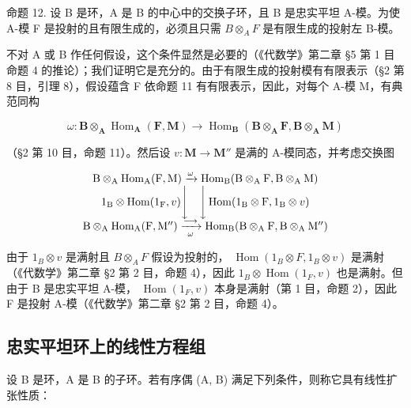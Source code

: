 命题 12. 设 B 是环，A 是 B 的中心中的交换子环，且 B 是忠实平坦 A-模。为使 A-模 F 是投射的且有限生成的，必须且只需 \(B \otimes_{A} F\) 是有限生成的投射左 B-模。

不对 A 或 B 作任何假设，这个条件显然是必要的（《代数学》第二章 §5 第 1 目命题 4 的推论）；我们证明它是充分的。由于有限生成的投射模有有限表示（§2 第 8 目，引理 8），假设蕴含 F 依命题 11 有有限表示，因此，对每个 A-模 M，有典范同构

\[
\omega : \mathbf {B} \otimes_ {\mathbf {A}} \operatorname{Hom} _ {\mathbf {A}} (\mathbf {F}, \mathbf {M}) \rightarrow \operatorname{Hom} _ {\mathbf {B}} (\mathbf {B} \otimes_ {\mathbf {A}} \mathbf {F}, \mathbf {B} \otimes_ {\mathbf {A}} \mathbf {M})
\]

（§2 第 10 目，命题 11）。然后设 \(v: \mathbf{M} \to \mathbf{M}''\) 是满的 A-模同态，并考虑交换图

\[
\begin{array}{c} \mathrm{B} \otimes_ {\mathrm{A}} \operatorname{Hom} _ {\mathrm{A}} (\mathrm{F}, \mathrm{M}) \xrightarrow {\omega} \operatorname{Hom} _ {\mathrm{B}} (\mathrm{B} \otimes_ {\mathrm{A}} \mathrm{F}, \mathrm{B} \otimes_ {\mathrm{A}} \mathrm{M}) \\ 1 _ {\mathrm{B}} \otimes \operatorname{Hom} (1 _ {\mathrm{F}}, v) \Bigg \downarrow \quad \Bigg \downarrow \operatorname{Hom} (1 _ {\mathrm{B}} \otimes \mathrm{F}, 1 _ {\mathrm{B}} \otimes v) \\ \mathrm{B} \otimes_ {\mathrm{A}} \operatorname{Hom} _ {\mathrm{A}} (\mathrm{F}, \mathrm{M} ^ {\prime \prime}) \xrightarrow [ \omega ]{\longrightarrow} \operatorname{Hom} _ {\mathrm{B}} (\mathrm{B} \otimes_ {\mathrm{A}} \mathrm{F}, \mathrm{B} \otimes_ {\mathrm{A}} \mathrm{M} ^ {\prime \prime}) \end{array}
\]

由于 \(1_{B} \otimes v\) 是满射且 \(B \otimes_{A} F\) 假设为投射的， \(\operatorname{Hom}(1_{B} \otimes F, 1_{B} \otimes v)\) 是满射（《代数学》第二章 §2 第 2 目，命题 4），因此 \(1_{B} \otimes \operatorname{Hom}(1_{F}, v)\) 也是满射。但由于 B 是忠实平坦 A-模， \(\operatorname{Hom}(1_{F}, v)\) 本身是满射（第 1 目，命题 2），因此 F 是投射 A-模（《代数学》第二章 §2 第 2 目，命题 4）。

\subsection{忠实平坦环上的线性方程组}

设 B 是环，A 是 B 的子环。若有序偶 (A, B) 满足下列条件，则称它具有线性扩张性质：

